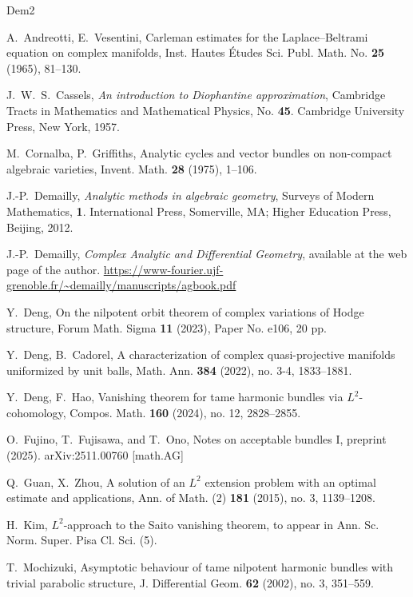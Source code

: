 \documentclass[12pt,twoside]{amsart}
\theoremstyle{definition}
\begin{document}
\begin{thebibliography}{Dem2} 

A.~Andreotti, E.~Vesentini, 
Carleman estimates for the Laplace--Beltrami equation 
on complex manifolds, 
Inst. Hautes \'Etudes Sci. Publ. Math. No. \textbf{25} (1965), 81--130.

J.~W.~S.~Cassels, {\em{An introduction to Diophantine approximation}}, 
Cambridge Tracts in Mathematics and Mathematical Physics, 
No. \textbf{45}. Cambridge University Press, New York, 1957.

M.~Cornalba, P.~Griffiths, 
Analytic cycles and vector bundles on non-compact 
algebraic varieties, Invent. Math. \textbf{28} (1975), 1--106. 

J.-P.~Demailly, {\em{Analytic methods in algebraic geometry}}, 
Surveys of Modern Mathematics, \textbf{1}. International 
Press, Somerville, MA; Higher Education Press, Beijing, 2012.

J.-P.~Demailly, {\em{Complex Analytic and Differential Geometry}}, 
available at the web page of the author.
\url{https://www-fourier.ujf-grenoble.fr/~demailly/manuscripts/agbook.pdf}

Y.~Deng, 
On the nilpotent orbit theorem 
of complex variations of Hodge structure, 
Forum Math. Sigma \textbf{11} (2023), Paper No. e106, 20 pp.

Y.~Deng, B.~Cadorel, 
A characterization of complex quasi-projective manifolds 
uniformized by unit balls, 
Math. Ann. \textbf{384} (2022), no. 3-4, 1833--1881.

Y.~Deng, F.~Hao, Vanishing theorem for 
tame harmonic bundles via $L^2$-cohomology, 
Compos. Math. \textbf{160} (2024), no. 12, 2828--2855.

O.~Fujino, T.~Fujisawa, and T.~Ono, 
Notes on acceptable bundles I, preprint (2025). 
arXiv:2511.00760 [math.AG] 

Q.~Guan, X.~Zhou, 
A solution of an $L^2$ extension problem with an optimal 
estimate and applications, 
Ann. of Math. (2) \textbf{181} (2015), no. 3, 1139--1208.

H.~Kim, $L^2$-approach to the Saito vanishing theorem, 
to appear in Ann. Sc. Norm. Super. Pisa Cl. Sci. (5). 

T.~Mochizuki, 
Asymptotic behaviour of tame 
nilpotent harmonic bundles with trivial 
parabolic structure, 
J. Differential Geom. \textbf{62} (2002), no. 3, 351--559. 


\end{thebibliography}
\end{document}
